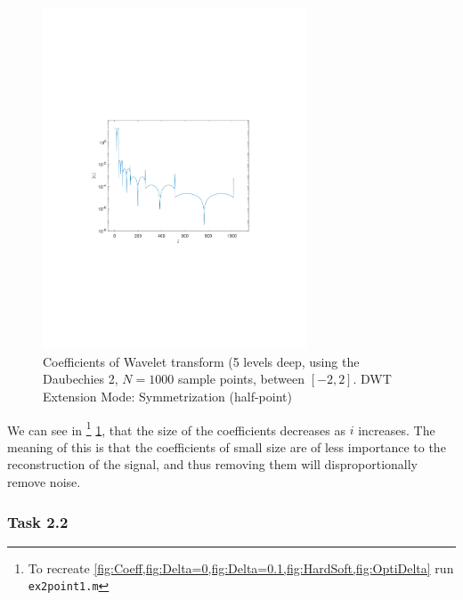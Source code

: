 \documentclass[a4paper]{article}
\begin{document}
    \begin{figure}[H]
	\centering
	\includegraphics[trim={3.5cm 8cm 4cm 9cm},clip,width=0.7\textwidth]{Images/Coefficents.pdf}
	\caption{Coefficients of Wavelet transform (5 levels deep, using the Daubechies 2, $N=1000$ sample points, between $[-2,2]$. DWT Extension Mode: Symmetrization (half-point)}
	\label{fig:Coeff}
    \end{figure}

    We can see in \footnote{To recreate \cref{fig:Coeff,fig:Delta=0,fig:Delta=0.1,fig:HardSoft,fig:OptiDelta} run \texttt{ex2point1.m}} \cref{fig:Coeff}, that the size of the coefficients decreases as $i$ increases. The meaning of this is that the coefficients of small size are of less importance to the reconstruction of the signal, and thus removing them will disproportionally remove noise.

    \subsubsection{Task 2.2} \label{subsubsec:thresholding}
\end{document}

